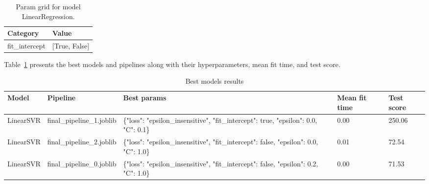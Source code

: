 \documentclass{article}%
\begin{document}
%


\begin{table}[H]%
\begin{center}%
\renewcommand{\arraystretch}{1.5}%
\begin{tabular}{l l}%
\hline%
\textbf{Category}&\textbf{Value}\\%
\hline%
fit\_intercept&{[}True, False{]}\\%
\hline%
\end{tabular}%
\end{center}%
\caption{Param grid for model LinearRegression.}%
\end{table}

%
Table~\ref{tab:best_models_results} %
presents the best models and pipelines along with their hyperparameters, mean fit time, and test score.%


\begin{table}[H]%
\begin{center}%
\renewcommand{\arraystretch}{1.5}%
\begin{tabular}{p{35mm} p{35mm} p{45mm} p{25mm} p{15mm}}%
\hline%
\textbf{Model}&\textbf{Pipeline}&\textbf{Best params}&\textbf{Mean fit time}&\textbf{Test score}\\%
\hline%
LinearSVR&final\_pipeline\_1.joblib&\{"loss": "epsilon\_insensitive", "fit\_intercept": true, "epsilon": 0.0, "C": 0.1\}&0.00&250.06\\%
LinearSVR&final\_pipeline\_2.joblib&\{"loss": "epsilon\_insensitive", "fit\_intercept": false, "epsilon": 0.0, "C": 1.0\}&0.01&72.54\\%
LinearSVR&final\_pipeline\_0.joblib&\{"loss": "epsilon\_insensitive", "fit\_intercept": false, "epsilon": 0.2, "C": 1.0\}&0.00&71.53\\%
\hline%
\end{tabular}%
\end{center}%
\caption{Best models results}%
\label{tab:best_models_results}%
\end{table}

%
\end{document}
